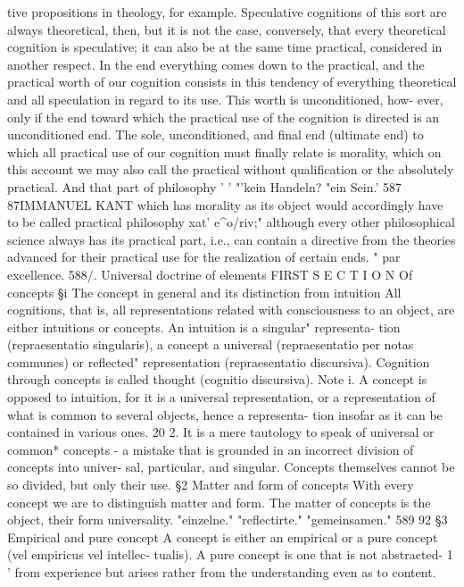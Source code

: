 tive propositions in theology, for example. Speculative cognitions of this
sort are always theoretical, then, but it is not the case, conversely, that
every theoretical cognition is speculative; it can also be at the same time
practical, considered in another respect.
In the end everything comes down to the practical, and the practical
worth of our cognition consists in this tendency of everything theoretical
and all speculation in regard to its use. This worth is unconditioned, how-
ever, only if the end toward which the practical use of the cognition is
directed is an unconditioned end. The sole, unconditioned, and final end
(ultimate end) to which all practical use of our cognition must finally
relate is morality, which on this account we may also call the practical
without qualification or the absolutely practical. And that part of philosophy
'
'
"'kein Handeln?
"ein Sein.'
587
87IMMANUEL KANT
which has morality as its object would accordingly have to be called
practical philosophy xat' e^o/riv;" although every other philosophical
science always has its practical part, i.e., can contain a directive from the
theories advanced for their practical use for the realization of certain ends.
"
par excellence.
588/.
Universal doctrine of elements
FIRST S E C T I O N
Of concepts
§i
The concept in general and its distinction from intuition
All cognitions, that is, all representations related with consciousness to an
object, are either intuitions or concepts. An intuition is a singular" representa-
tion (repraesentatio singularis), a concept a universal (repraesentatio per notas
communes) or reflected" representation (repraesentatio discursiva).
Cognition through concepts is called thought (cognitio discursiva).
Note i. A concept is opposed to intuition, for it is a universal representation, or a
representation of what is common to several objects, hence a representa-
tion insofar as it can be contained in various ones. 20
2. It is a mere tautology to speak of universal or common* concepts - a
mistake that is grounded in an incorrect division of concepts into univer-
sal, particular, and singular. Concepts themselves cannot be so divided,
but only their use.
§2
Matter and form of concepts
With every concept we are to distinguish matter and form. The matter of
concepts is the object, their form universality.
"einzelne."
"reflectirte."
"gemeinsamen."
589
92
§3
Empirical and pure concept
A concept is either an empirical or a pure concept (vel empiricus vel intellec-
tualis). A pure concept is one that is not abstracted- 1 ' from experience but
arises rather from the understanding even as to content.
